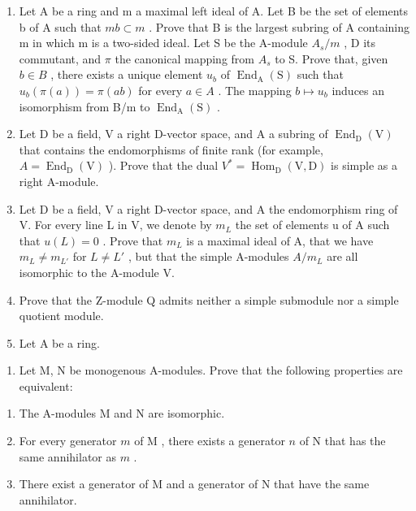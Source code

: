 
\begin{enumerate}
\def\labelenumi{\arabic{enumi})}
\item
  Let A be a ring and m a maximal left ideal of A. Let B be the set of elements b of A such that \(mb \subset m\) . Prove that B is the largest subring of A containing m in which m is a two-sided ideal. Let S be the A-module \(A_{s}/m\) , D its commutant, and \(\pi\) the canonical mapping from \(A_{s}\) to S. Prove that, given \(b \in B\) , there exists a unique element \(u_{b}\) of \(\operatorname{End}_{\mathrm{A}}(\mathrm{S})\) such that \(u_{b}(\pi(a)) = \pi(ab)\) for every \(a \in A\) . The mapping \(b \mapsto u_{b}\) induces an isomorphism from B/m to \(\operatorname{End}_{\mathrm{A}}(\mathrm{S})\) .
\item
  Let D be a field, V a right D-vector space, and A a subring of \(\operatorname{End}_{\mathrm{D}}(\mathrm{V})\) that contains the endomorphisms of finite rank (for example, \(A = \operatorname{End}_{\mathrm{D}}(\mathrm{V})\) ). Prove that the dual \(V^{*} = \operatorname{Hom}_{\mathrm{D}}(\mathrm{V}, \mathrm{D})\) is simple as a right A-module.
\item
  Let D be a field, V a right D-vector space, and A the endomorphism ring of V. For every line L in V, we denote by \(m_{L}\) the set of elements u of A such that \(u(L)=0\) . Prove that \(m_{L}\) is a maximal ideal of A, that we have \(m_{L}\neq m_{L'}\) for \(L\neq L'\) , but that the simple A-modules \(A/m_{L}\) are all isomorphic to the A-module V.
\item
  Prove that the Z-module Q admits neither a simple submodule nor a simple quotient module.
\item
  Let \(\mathrm{A}\) be a ring.
\end{enumerate}

\begin{enumerate}
\def\labelenumi{\alph{enumi})}
\tightlist
\item
  Let M, N be monogenous A-modules. Prove that the following properties are equivalent:
\end{enumerate}

\begin{enumerate}
\def\labelenumi{(\roman{enumi})}
\item
  The A-modules M and N are isomorphic.
\item
  For every generator \(m\) of \(\mathrm{M}\) , there exists a generator \(n\) of \(\mathrm{N}\) that has the same annihilator as \(m\) .
\item
  There exist a generator of M and a generator of N that have the same annihilator.
\end{enumerate}

